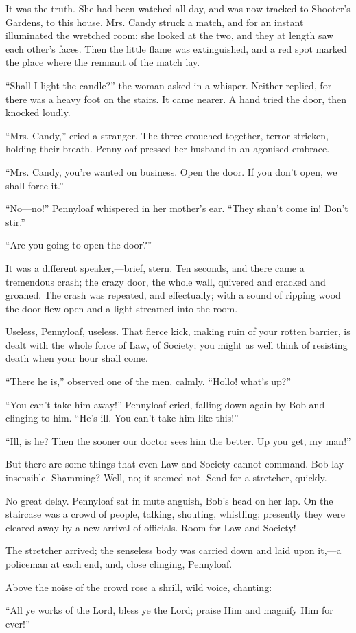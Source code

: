 It was the truth. She had been watched all day, and was now tracked to
Shooter's Gardens, to this house. Mrs. Candy struck a match, and for an
instant illuminated the wretched room; she looked at the two, and they
at length saw each other's faces. Then the little flame was
extinguished, and a red spot marked the place where the remnant of the
match lay.

{}``Shall I light the candle?'' the woman asked in a whisper. Neither
replied, for there was a heavy foot on the stairs. It came nearer. A
hand tried the door, then knocked loudly.

``Mrs. Candy,'' cried a stranger. The three crouched together,
terror-stricken, holding their breath. Pennyloaf pressed her husband in
an agonised embrace.

``Mrs. Candy, you're wanted on business. Open the door. If you don't
open, we shall force it.''

``No---no!'' Pennyloaf whispered in her mother's ear. ``They shan't come
in! Don't stir.''

``Are you going to open the door?''

It was a different speaker,---brief, stern. Ten seconds, and there came
a tremendous crash; the crazy door, the whole wall, quivered and cracked
and groaned. The crash was repeated, and effectually; with a sound of
ripping wood the door flew open and a light streamed into the room.

Useless, Pennyloaf, useless. That fierce kick, making ruin of your
rotten barrier, is dealt with the whole force of Law, of Society; {}you
might as well think of resisting death when your hour shall come.

``There he is,'' observed one of the men, calmly. ``Hollo! what's up?''

``You can't take him away!'' Pennyloaf cried, falling down again by Bob
and clinging to him. ``He's ill. You can't take him like this!''

``Ill, is he? Then the sooner our doctor sees him the better. Up you
get, my man!''

But there are some things that even Law and Society cannot command. Bob
lay insensible. Shamming? Well, no; it seemed not. Send for a stretcher,
quickly.

No great delay. Pennyloaf sat in mute anguish, Bob's head on her lap. On
the staircase was a crowd of people, talking, shouting, whistling;
presently they were cleared away by a new arrival of officials. Room for
Law and Society!

The stretcher arrived; the senseless body was carried down and laid upon
it,---a policeman at each end, and, close clinging, Pennyloaf.

Above the noise of the crowd rose a shrill, wild voice, chanting:

``All ye works of the Lord, bless ye the Lord; praise Him and magnify
Him for ever!''
